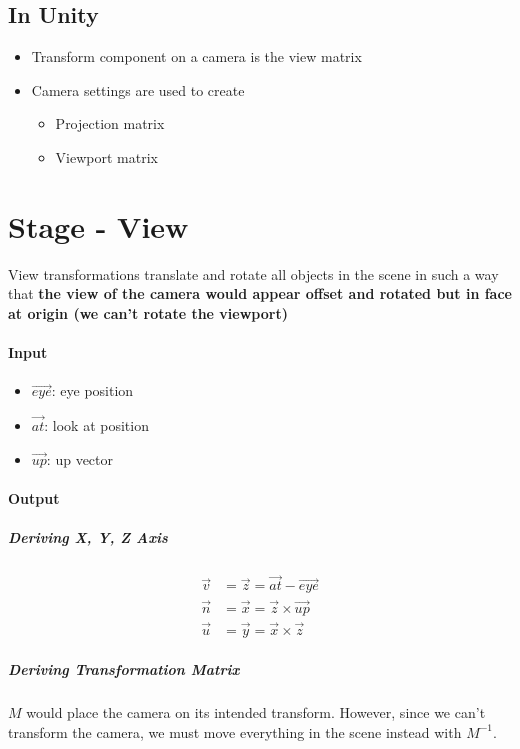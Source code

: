   \subsection{In Unity}

    \begin{itemize}
      \item Transform component on a camera is the view matrix
      \item Camera settings are used to create
      \begin{itemize}
        \item Projection matrix
        \item Viewport matrix
      \end{itemize}
    \end{itemize}

\section{Stage - View}

  View transformations translate and rotate all objects in the scene in such
  a way that \textbf{the view of the camera would appear offset and rotated but
  in face at origin (we can't rotate the viewport)}

  \paragraph{Input}
  \begin{itemize}
    \item $ \vec{eye} $: eye position
    \item $ \vec{at} $: look at position
    \item $ \vec{up} $: up vector
  \end{itemize}

  \paragraph{Output}
  \subparagraph{Deriving X, Y, Z Axis}
  \begin{align}
    \vec{v} &= \vec{z} = \vec{at} - \vec{eye} \\
    \vec{n} &= \vec{x} = \vec{z} \times \vec{up} \\
    \vec{u} &= \vec{y} = \vec{x} \times \vec{z}
  \end{align}

  \subparagraph{Deriving Transformation Matrix}
  $ M $ would place the camera on its intended transform. However, since
  we can't transform the camera, we must move everything in the scene instead
  with $ M^{-1} $.

